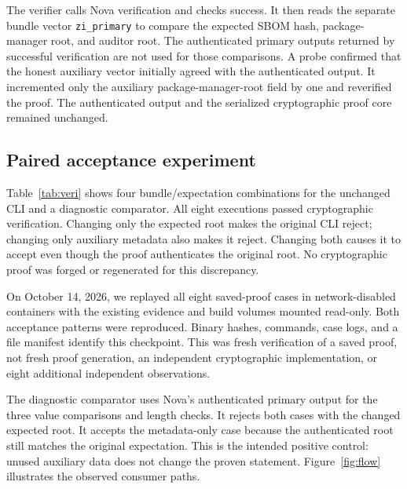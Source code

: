 \documentclass[sigconf,nonacm]{acmart}
\begin{document}
The verifier calls Nova verification and checks success. It then reads the separate bundle vector \texttt{zi\_primary} to compare the expected SBOM hash, package-manager root, and auditor root. The authenticated primary outputs returned by successful verification are not used for those comparisons. A probe confirmed that the honest auxiliary vector initially agreed with the authenticated output. It incremented only the auxiliary package-manager-root field by one and reverified the proof. The authenticated output and the serialized cryptographic proof core remained unchanged.

\subsection{Paired acceptance experiment}
Table~\ref{tab:veri} shows four bundle/expectation combinations for the unchanged CLI and a diagnostic comparator. All eight executions passed cryptographic verification. Changing only the expected root makes the original CLI reject; changing only auxiliary metadata also makes it reject. Changing both causes it to accept even though the proof authenticates the original root. No cryptographic proof was forged or regenerated for this discrepancy.


On October 14, 2026, we replayed all eight saved-proof cases in network-disabled containers with the existing evidence and build volumes mounted read-only. Both acceptance patterns were reproduced. Binary hashes, commands, case logs, and a file manifest identify this checkpoint. This was fresh verification of a saved proof, not fresh proof generation, an independent cryptographic implementation, or eight additional independent observations.

The diagnostic comparator uses Nova's authenticated primary output for the three value comparisons and length checks. It rejects both cases with the changed expected root. It accepts the metadata-only case because the authenticated root still matches the original expectation. This is the intended positive control: unused auxiliary data does not change the proven statement. Figure~\ref{fig:flow} illustrates the observed consumer paths.
\end{document}
